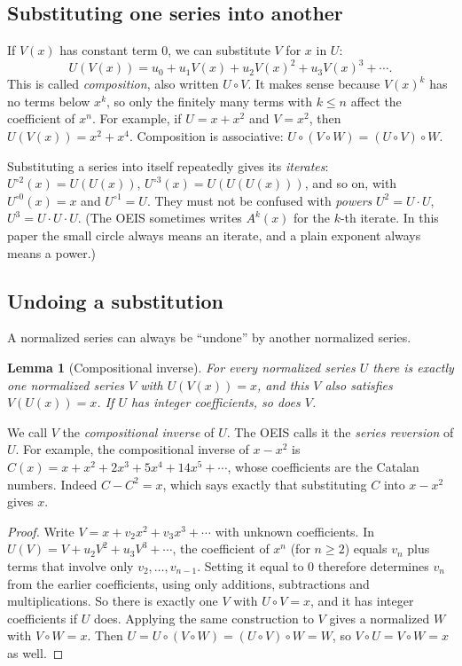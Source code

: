 \documentclass[11pt,a4paper]{article}
\newtheorem{lemma}[theorem]{Lemma}
\theoremstyle{definition}
\theoremstyle{remark}
\begin{document}
\subsection{Substituting one series into another}
If $V(x)$ has constant term $0$, we can substitute $V$ for $x$ in $U$:
\[
U(V(x))=u_0+u_1V(x)+u_2V(x)^2+u_3V(x)^3+\cdots .
\]
This is called \emph{composition}, also written $U\circ V$. It makes sense because $V(x)^k$ has no terms below $x^k$,
so only the finitely many terms with $k\le n$ affect the coefficient of $x^n$. For example, if $U=x+x^2$ and $V=x^2$, then
$U(V(x))=x^2+x^4$. Composition is associative: $U\circ(V\circ W)=(U\circ V)\circ W$.

Substituting a series into itself repeatedly gives its \emph{iterates}: $U^{\circ2}(x)=U(U(x))$,
$U^{\circ3}(x)=U(U(U(x)))$, and so on, with $U^{\circ0}(x)=x$ and $U^{\circ1}=U$. They must not be confused with
\emph{powers} $U^2=U\cdot U$, $U^3=U\cdot U\cdot U$. (The OEIS sometimes writes $A^k(x)$ for the $k$-th iterate. In
this paper the small circle always means an iterate, and a plain exponent always means a power.)

\subsection{Undoing a substitution}
A normalized series can always be ``undone'' by another normalized series.

\begin{lemma}[Compositional inverse]\label{lem:inverse}
For every normalized series $U$ there is exactly one normalized series $V$ with $U(V(x))=x$, and this $V$ also
satisfies $V(U(x))=x$. If $U$ has integer coefficients, so does $V$.
\end{lemma}

We call $V$ the \emph{compositional inverse} of $U$. The OEIS calls it the \emph{series reversion} of $U$. For example,
the compositional inverse of $x-x^2$ is $C(x)=x+x^2+2x^3+5x^4+14x^5+\cdots$, whose coefficients are the Catalan numbers.
Indeed $C-C^2=x$, which says exactly that substituting $C$ into $x-x^2$ gives $x$.

\begin{proof}
Write $V=x+v_2x^2+v_3x^3+\cdots$ with unknown coefficients. In
$U(V)=V+u_2V^2+u_3V^3+\cdots$, the coefficient of $x^n$ (for $n\ge2$) equals $v_n$ plus terms that involve only
$v_2,\dots,v_{n-1}$. Setting it equal to $0$ therefore determines $v_n$ from the earlier coefficients, using only
additions, subtractions and multiplications. So there is exactly one $V$ with $U\circ V=x$, and it has integer
coefficients if $U$ does. Applying the same construction to $V$ gives a normalized $W$ with $V\circ W=x$. Then
$U=U\circ(V\circ W)=(U\circ V)\circ W=W$, so $V\circ U=V\circ W=x$ as well.
\end{proof}
\end{document}
